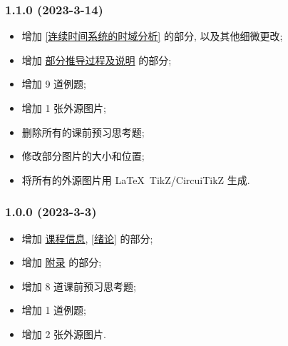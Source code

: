 \subsubsection*{1.1.0 (2023-3-14)}
\begin{itemize}
    \item 增加 \ref{连续时间系统的时域分析} 的部分, 以及其他细微更改;
    \item 增加 \hyperref[部分推导过程及说明]{部分推导过程及说明} 的部分;
    \item 增加 9 道例题;
    \item 增加 1 张外源图片;
    \item 删除所有的课前预习思考题;
    \item 修改部分图片的大小和位置;
    \item 将所有的外源图片用 \LaTeX\ TikZ/CircuiTikZ 生成.
\end{itemize}

\subsubsection*{1.0.0 (2023-3-3)}
\begin{itemize}
    \item 增加 \hyperref[课程信息]{课程信息}, \ref{绪论} 的部分;
    \item 增加 \hyperref[附录]{附录} 的部分;
    \item 增加 8 道课前预习思考题;
    \item 增加 1 道例题;
    \item 增加 2 张外源图片.
\end{itemize}

